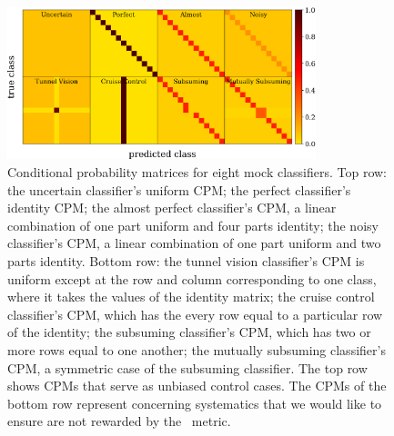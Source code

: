 \begin{figure}
	\begin{center}
    \includegraphics[width=0.8\textwidth]{./fig/all_sim_cm.png}
		\caption{Conditional probability matrices  for eight mock classifiers.
		Top row:
		the uncertain classifier's uniform CPM;
		the perfect classifier's identity CPM;
		the almost perfect classifier's CPM, a linear combination of one part uniform and four parts identity;
		the noisy classifier's CPM, a linear combination of one part uniform and two parts identity.
		Bottom row:
		the tunnel vision classifier's CPM is uniform except at the row and column corresponding to one class, where it takes the values of the identity matrix;
		the cruise control classifier's CPM, which has the every row equal to a particular row of the identity;
		the subsuming classifier's CPM, which has two or more rows equal to one another;
		the mutually subsuming classifier's CPM, a symmetric case of the subsuming classifier.
		The top row shows CPMs that serve as unbiased control cases.
		The CPMs of the bottom row represent concerning systematics that we would like to ensure are not rewarded by the \plasticc\ metric.
		}
		\label{fig:mock_cm}
	\end{center}
\end{figure}

